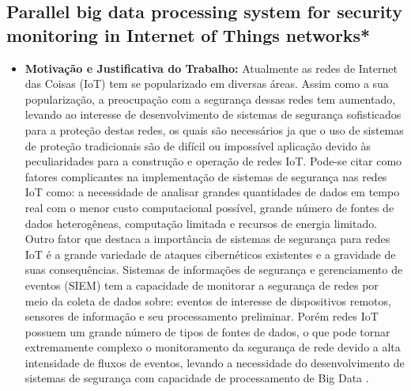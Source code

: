 \documentclass[tid,table]{texufpel} %
\begin{document}
\subsection{Parallel big data processing system for security monitoring in Internet of Things networks*}

\begin{itemize}
	\item \textbf{Motivação e Justificativa do Trabalho:} Atualmente as redes de Internet das Coisas (IoT) tem se popularizado em diversas áreas. Assim como a sua popularização, a preocupação com a segurança dessas redes tem aumentado, levando ao interesse de desenvolvimento de sistemas de segurança sofisticados para a proteção destas redes, os quais são necessários ja que o uso de sistemas de proteção tradicionais são de difícil ou impossível aplicação devido às peculiaridades para a construção e operação de redes IoT. Pode-se citar como fatores complicantes na implementação de sistemas de segurança nas redes IoT como: a necessidade de analisar grandes quantidades de dados em tempo real com o menor custo computacional possível, grande número de fontes de dados heterogêneas, computação limitada e recursos de energia limitado. Outro fator que destaca a importância de sistemas de segurança para redes IoT é a grande variedade de ataques cibernéticos existentes e a gravidade de suas consequências. Sistemas de informações de segurança e gerenciamento de eventos (SIEM) tem a capacidade de monitorar a segurança de redes por meio da coleta de dados sobre: eventos de interesse de dispositivos remotos, sensores de informação e seu processamento preliminar. Porém redes IoT possuem um grande número de tipos de fontes de dados, o que pode tornar extremamente complexo o monitoramento da segurança de rede devido a alta intensidade de fluxos de eventos, levando a necessidade do desenvolvimento de sistemas de segurança com capacidade de processamento de Big Data \cite{art8kotenko2017parallel}.
	

\end{itemize}
\end{document}

